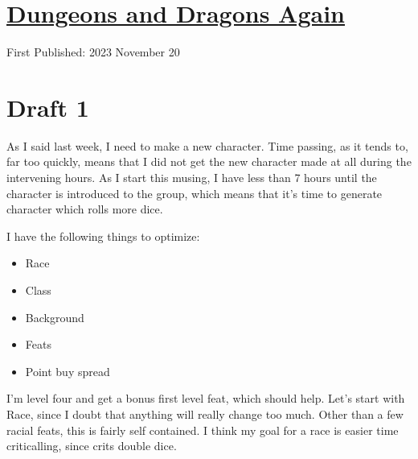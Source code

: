 \documentclass[12pt]{article}[titlepage]
\renewcommand{\,}{\textsuperscript{,}}
\begin{document}
\doublespacing
\section{\href{dungeons-dragons-7.html}{Dungeons and Dragons Again}}
First Published: 2023 November 20

\section{Draft 1}
As I said last week, I need to make a new character.
Time passing, as it tends to, far too quickly, means that I did not get the new character made at all during the intervening hours.
As I start this musing, I have less than 7 hours until the character is introduced to the group, which means that it's time to generate character which rolls more dice.

I have the following things to optimize:
\begin{itemize}
\item Race
\item Class
\item Background
\item Feats
\item Point buy spread
\end{itemize}

I'm level four and get a bonus first level feat, which should help.
Let's start with Race, since I doubt that anything will really change too much.
Other than a few racial feats, this is fairly self contained.
I think my goal for a race is easier time criticalling, since crits double dice.
\end{document}
